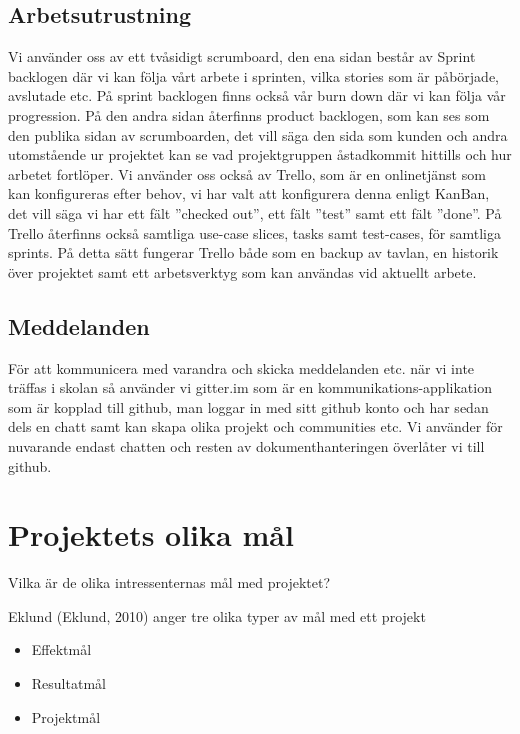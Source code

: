 \documentclass[11pt]{article}
\begin{document}
\subsection{Arbetsutrustning}
\label{sec:orgb108a88}
Vi använder oss av ett tvåsidigt scrumboard, den ena sidan består av
Sprint backlogen där vi kan följa vårt arbete i sprinten, vilka stories
som är påbörjade, avslutade etc. På sprint backlogen finns också vår
burn down där vi kan följa vår progression. På den andra sidan återfinns
product backlogen, som kan ses som den publika sidan av scrumboarden,
det vill säga den sida som kunden och andra utomstående ur projektet kan
se vad projektgruppen åstadkommit hittills och hur arbetet fortlöper. Vi
använder oss också av Trello, som är en onlinetjänst som kan
konfigureras efter behov, vi har valt att konfigurera denna enligt
KanBan, det vill säga vi har ett fält ”checked out”, ett fält ”test”
samt ett fält ”done”. På Trello återfinns också samtliga use-case
slices, tasks samt test-cases, för samtliga sprints. På detta sätt
fungerar Trello både som en backup av tavlan, en historik över projektet
samt ett arbetsverktyg som kan användas vid aktuellt arbete.

\subsection{Meddelanden}
\label{sec:orgec838cb}
För att kommunicera med varandra och skicka meddelanden etc. när vi inte
träffas i skolan så använder vi gitter.im som är en
kommunikations-applikation som är kopplad till github, man loggar in med
sitt github konto och har sedan dels en chatt samt kan skapa olika
projekt och communities etc. Vi använder för nuvarande endast chatten
och resten av dokumenthanteringen överlåter vi till github.

\section{Projektets olika mål}
\label{sec:orgcc77bf6}
Vilka är de olika intressenternas mål med projektet?

Eklund (Eklund, 2010) anger tre olika typer av mål med ett projekt

\begin{itemize}
\item Effektmål

\item Resultatmål

\item Projektmål
\end{itemize}
\end{document}
